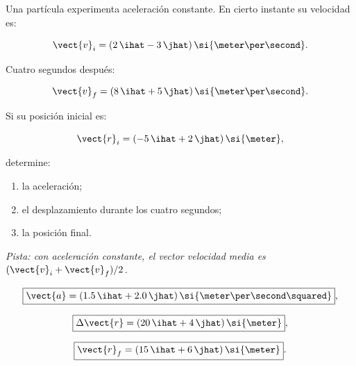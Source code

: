 \begin{ejercicio}
Una partícula experimenta aceleración constante. En cierto instante su velocidad es:

\[
\vect{v}_i
=
(2\,\ihat-3\,\jhat)\,
\si{\meter\per\second}.
\]

Cuatro segundos después:

\[
\vect{v}_f
=
(8\,\ihat+5\,\jhat)\,
\si{\meter\per\second}.
\]

Si su posición inicial es:

\[
\vect{r}_i
=
(-5\,\ihat+2\,\jhat)\,\si{\meter},
\]

determine:

\begin{enumerate}[label=\alph*)]
    \item la aceleración;
    \item el desplazamiento durante los cuatro segundos;
    \item la posición final.
\end{enumerate}

\textit{Pista: con aceleración constante, el vector velocidad media es \((\vect{v}_i+\vect{v}_f)/2\).}
\end{ejercicio}

\begin{respuesta}
\[
\boxed{
\vect{a}
=
(1.5\,\ihat+2.0\,\jhat)\,
\si{\meter\per\second\squared}
},
\]

\[
\boxed{
\Delta\vect{r}
=
(20\,\ihat+4\,\jhat)\,\si{\meter}
},
\]

\[
\boxed{
\vect{r}_f
=
(15\,\ihat+6\,\jhat)\,\si{\meter}
}.
\]
\end{respuesta}

